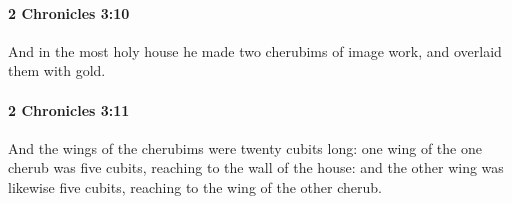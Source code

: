 		\paragraph{2 Chronicles 3:10} %
			\label{2CHRONICLES-3-10}

			And in the most holy house he made two cherubims of image work, and overlaid them with gold.


		\paragraph{2 Chronicles 3:11} %
			\label{2CHRONICLES-3-11}

			And the wings of the cherubims were twenty cubits long: one wing of the one cherub was five cubits, reaching to the wall of the house: and the other wing was likewise five cubits, reaching to the wing of the other cherub.


